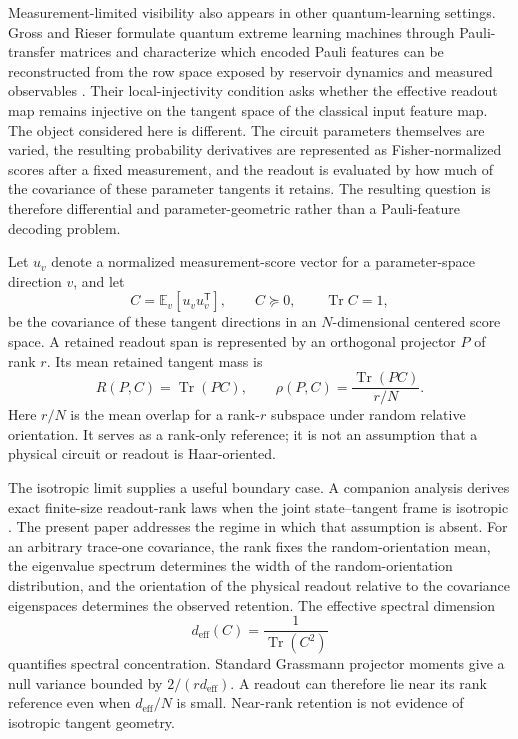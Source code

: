 \documentclass[ASNA,twocolumn]{USG}
\begin{document}
Measurement-limited visibility also appears in other quantum-learning settings. Gross and Rieser formulate quantum extreme learning machines through Pauli-transfer matrices and characterize which encoded Pauli features can be reconstructed from the row space exposed by reservoir dynamics and measured observables \cite{GrossRieser2026}. Their local-injectivity condition asks whether the effective readout map remains injective on the tangent space of the classical input feature map. The object considered here is different. The circuit parameters themselves are varied, the resulting probability derivatives are represented as Fisher-normalized scores after a fixed measurement, and the readout is evaluated by how much of the covariance of these parameter tangents it retains. The resulting question is therefore differential and parameter-geometric rather than a Pauli-feature decoding problem.

Let $u_v$ denote a normalized measurement-score vector for a parameter-space direction $v$, and let
\begin{equation}
C=\mathbb{E}_v[u_vu_v^{\mathsf T}],
\qquad C\succeq0,
\qquad \operatorname{Tr}C=1,
\end{equation}
be the covariance of these tangent directions in an $N$-dimensional centered score space. A retained readout span is represented by an orthogonal projector $P$ of rank $r$. Its mean retained tangent mass is
\begin{equation}
R(P,C)=\operatorname{Tr}(PC),
\qquad
\rho(P,C)=\frac{\operatorname{Tr}(PC)}{r/N}.
\label{eq:aqt-intro-rho}
\end{equation}
Here $r/N$ is the mean overlap for a rank-$r$ subspace under random relative orientation. It serves as a rank-only reference; it is not an assumption that a physical circuit or readout is Haar-oriented.

The isotropic limit supplies a useful boundary case. A companion analysis derives exact finite-size readout-rank laws when the joint state--tangent frame is isotropic \cite{AitHaddou2026IsotropicRankLaws}. The present paper addresses the regime in which that assumption is absent. For an arbitrary trace-one covariance, the rank fixes the random-orientation mean, the eigenvalue spectrum determines the width of the random-orientation distribution, and the orientation of the physical readout relative to the covariance eigenspaces determines the observed retention. The effective spectral dimension
\begin{equation}
 d_{\mathrm{eff}}(C)=\frac{1}{\operatorname{Tr}(C^2)}
\end{equation}
quantifies spectral concentration. Standard Grassmann projector moments \cite{CollinsMatsumoto2017,Bendokat2024} give a null variance bounded by $2/(r d_{\mathrm{eff}})$. A readout can therefore lie near its rank reference even when $d_{\mathrm{eff}}/N$ is small. Near-rank retention is not evidence of isotropic tangent geometry.
\end{document}
